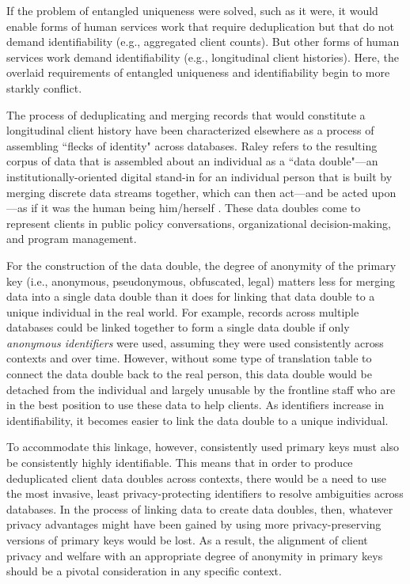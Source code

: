 If the problem of entangled uniqueness were solved, such as it were, it would enable forms of human services work that require deduplication but that do not demand identifiability (e.g., aggregated client counts). But other forms of human services work demand identifiability (e.g., longitudinal client histories). Here, the overlaid requirements of entangled uniqueness and identifiability begin to more starkly conflict.

The process of deduplicating and merging records that would constitute a longitudinal client history have been characterized elsewhere as a process of assembling ``flecks of identity" \citep{Fuller2005Media} across databases. Raley refers to the resulting corpus of data that is assembled about an individual as a ``data double"---an institutionally-oriented digital stand-in for an individual person that is built by merging discrete data streams together, which can then act---and be acted upon---as if it was the human being him/herself \citep{Raley2013Dataveillance}. These data doubles come to represent clients in public policy conversations, organizational decision-making, and program management.

For the construction of the data double, the degree of anonymity of the primary key (i.e., anonymous, pseudonymous, obfuscated, legal) matters less for merging data into a single data double than it does for linking that data double to a unique individual in the real world. For example, records across multiple databases could be linked together to form a single data double if only \textit{anonymous identifiers} were used, assuming they were used consistently across contexts and over time. However, without some type of translation table to connect the data double back to the real person, this data double would be detached from the individual and largely unusable by the frontline staff who are in the best position to use these data to help clients. As identifiers increase in identifiability, it becomes easier to link the data double to a unique individual.

To accommodate this linkage, however, consistently used primary keys must also be consistently highly identifiable. This means that in order to produce deduplicated client data doubles across contexts, there would be a need to use the most invasive, least privacy-protecting identifiers to resolve ambiguities across databases. In the process of linking data to create data doubles, then, whatever privacy advantages might have been gained by using more privacy-preserving versions of primary keys would be lost. As a result, the alignment of client privacy and welfare with an appropriate degree of anonymity in primary keys should be a pivotal consideration in any specific context. 


